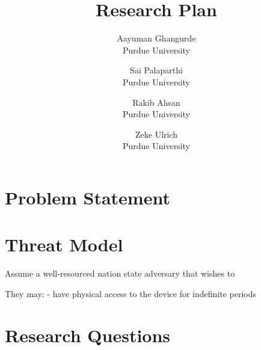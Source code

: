 \documentclass[letterpaper,twocolumn,10pt]{article}
\begin{document}

\date{}

\title{\Large \bf Research Plan}

\author{
  {\rm Aayuman Ghangurde}\\
  Purdue University
  \and
  {\rm Sai Palaparthi}\\
  Purdue University
  \and
  {\rm Rakib Ahsan}\\
  Purdue University
  \and
  {\rm Zeke Ulrich}\\
  Purdue University
}

\maketitle

\section{Problem Statement}



\section{Threat Model}

Assume a well-resourced nation state adversary that 
wishes to 

They may:
- have physical access to the device for indefinite periods

\section{Research Questions}
\end{document}
